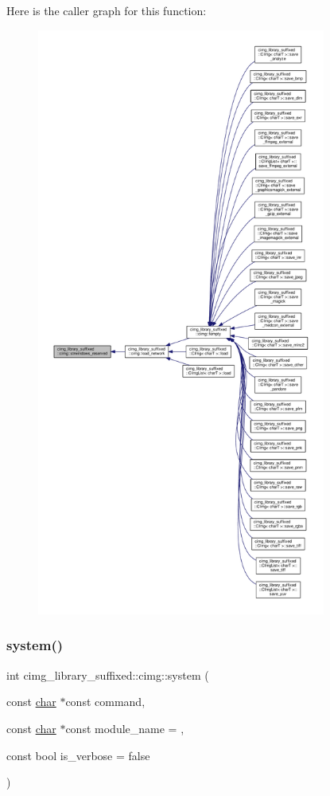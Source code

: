 Here is the caller graph for this function\+:
\nopagebreak
\begin{figure}[H]
\begin{center}
\leavevmode
\includegraphics[height=550pt]{d4/d9b/namespacecimg__library__suffixed_1_1cimg_a3dff5896c142fb4f9dbd2d49facd33c0_icgraph}
\end{center}
\end{figure}
\mbox{\label{namespacecimg__library__suffixed_1_1cimg_a5ddfa532b09b12973f543977f1f688da}} 
\subsubsection{\texorpdfstring{system()}{system()}}
{\footnotesize\ttfamily int cimg\+\_\+library\+\_\+suffixed\+::cimg\+::system (\begin{DoxyParamCaption}\item[{const \hyperlink{classchar}{char} $\ast$const}]{command,  }\item[{const \hyperlink{classchar}{char} $\ast$const}]{module\+\_\+name = {},  }\item[{const bool}]{is\+\_\+verbose = {\ttfamily false} }\end{DoxyParamCaption})\hspace{0.3cm}{\ttfamily [inline]}}


